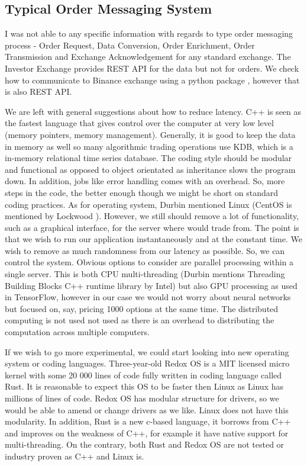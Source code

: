 \documentclass[12pt]{article}
\begin{document}
\subsection{Typical Order Messaging System}
I was not able to any specific information with regards to type order messaging process - Order Request, Data Conversion, Order Enrichment, Order Transmission and Exchange Acknowledgement for any standard exchange. The Investor Exchange provides REST API \cite{iex} for the data but not for orders. We check how to communicate to Binance exchange using a python package \cite{bapi}, however that is also REST API.

We are left with general suggestions about how to reduce latency. C++ is seen as the fastest language that gives control over the computer at very low level (memory pointers, memory management). Generally, it is good to keep the data in memory as well so many algorithmic trading operations use KDB, which is a in-memory relational time series database. The coding style should be modular and functional as opposed to object orientated as inheritance slows the program down. In addition, jobs like error handling comes with an overhead. So, more steps in the code, the better enough though we might be short on standard coding practices. As for operating system, Durbin \cite{durbin} mentioned Linux (CentOS is mentioned by Lockwood \cite{lockwood}). However, we still should remove a lot of  
functionality, such as a graphical interface, for the server where would trade from. The point is that we wish to run our application instantaneously and at the constant time. We wish to remove as much randomness from our latency as possible. So, we can control the system. Obvious options to consider are parallel processing within a single server. This is both CPU multi-threading (Durbin \cite{durbin} mentions Threading Building Blocks C++ runtime library by Intel) but also GPU processing as used in TensorFlow, however in our case we would not worry about neural networks but focused on, say, pricing 1000 options at the same time. The distributed computing is not used not used as there is an overhead to distributing the computation across multiple computers.

If we wish to go more experimental, we could start looking into new operating system or coding languages. Three-year-old Redox OS is a  MIT licensed micro kernel with some 20 000 lines of code fully written in coding language called Rust. It is reasonable to expect this OS to be faster then Linux as Linux has millions of lines of code. Redox OS has modular structure for drivers, so we would be able to amend or change drivers as we like. Linux does not have this modularity. In addition, Rust is a new c-based language, it borrows from C++ and improves on the weakness of C++, for example it have native support for multi-threading. On the contrary, both Rust and Redox OS are not tested or industry proven as C++ and Linux is.
\end{document}
